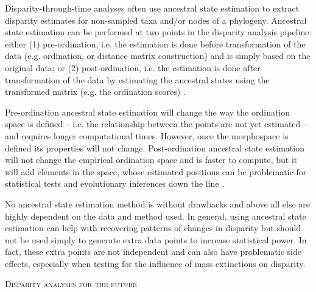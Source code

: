 \documentclass[12pt,letterpaper]{article}
\renewcommand{\section}[1]{%
\bigskip
\begin{center}
\begin{Large}
\normalfont\scshape #1
\medskip
\end{Large}
\end{center}}
\renewcommand{\subsection}[1]{%
\bigskip
\begin{center}
\begin{large}
\normalfont\itshape #1
\end{large}
\end{center}}
\begin{document}


Disparity-through-time analyses often use ancestral state estimation to extract disparity estimates for non-sampled taxa and/or nodes of a phylogeny.
Ancestral state estimation can be performed at two points in the disparity analysis pipeline: either (1) pre-ordination, i.e. the estimation is done before transformation of the data (e.g. ordination, or distance matrix construction) and is simply based on the original data; or (2) post-ordination, i.e. the estimation is done after transformation of the data by estimating the ancestral states using the transformed matrix (e.g. the ordination scores) \citep{lloyd2018}.

Pre-ordination ancestral state estimation will change the way the ordination space is defined -- i.e. the relationship between the points are not yet estimated -- and requires longer computational times.
However, once the morphospace is defined its properties will not change.
Post-ordination ancestral state estimation will not change the empirical ordination space and is faster to compute, but it will add elements in the space, whose estimated positions can be problematic for statistical tests and evolutionary inferences down the line \citep{lloyd2018}.

No ancestral state estimation method is without drawbacks
 and above all else are highly dependent on the data and method used.
In general, using ancestral state estimation can help with recovering patterns of changes in disparity but should not be used simply to generate extra data points to increase statistical power.
In fact, these extra points are not independent and can also have problematic side effects, especially when testing for the influence of mass extinctions on disparity.

\section{Disparity analyses for the future}
\label{section:future}
\end{document}
